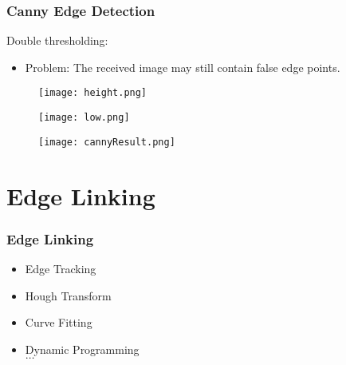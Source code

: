 \documentclass[notheorems,serif,table,compress]{beamer}  %
\begin{document}
\begin{frame}
\frametitle{Canny Edge Detection}
{\color{blue}Double thresholding:}
\begin{itemize}
\item Problem: The received image may still contain false edge points.
\end{itemize}
    \begin{figure}
    \begin{minipage}[t]{0.35\linewidth}
    \texttt{[image: height.png]} 
    \end{minipage}
    \begin{minipage}[t]{0.35\linewidth}
    \texttt{[image: low.png]} 
    \end{minipage}
    \end{figure}
    \begin{figure}
    \texttt{[image: cannyResult.png]} 
    \end{figure}
\end{frame}


\section{Edge Linking}

\begin{frame}
\frametitle{Edge Linking}
    \begin{itemize}
    \item Edge Tracking
    \item Hough Transform
    \item Curve Fitting
    \item Dynamic Programming\\
    $\dots$
    \end{itemize}
\end{frame}
  
\end{document}
